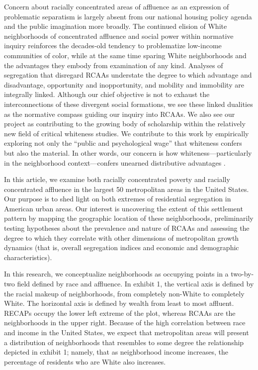 \documentclass[11pt,]{article}
\begin{document}
Concern about racially concentrated areas of affluence as an expression
of problematic separatism is largely absent from our national housing
policy agenda and the public imagination more broadly. The continued
elision of White neighborhoods of concentrated affluence and social
power within normative inquiry reinforces the decades-old tendency to
problematize low-income communities of color, while at the same time
sparing White neighborhoods and the advantages they embody from
examination of any kind. Analyses of segregation that disregard RCAAs
understate the degree to which advantage and disadvantage, opportunity
and inopportunity, and mobility and immobility are integrally linked.
Although our chief objective is not to exhaust the interconnections of
these divergent social formations, we see these linked dualities as the
normative compass guiding our inquiry into RCAAs. We also see our
project as contributing to the growing body of scholarship within the
relatively new field of critical whiteness studies. We contribute to
this work by empirically exploring not only the ``public and
psychological wage'' that whiteness confers
\autocite{du2017black,roediger1999wages} but also the material. In other
words, our concern is how whiteness---particularly in the neighborhood
context---confers unearned distributive advantages
\autocite{lipsitz2006possessive}.

In this article, we examine both racially concentrated poverty and
racially concentrated affluence in the largest 50 metropolitan areas in
the United States. Our purpose is to shed light on both extremes of
residential segregation in American urban areas. Our interest is
uncovering the extent of this settlement pattern by mapping the
geographic location of these neighborhoods, preliminarily testing
hypotheses about the prevalence and nature of RCAAs and assessing the
degree to which they correlate with other dimensions of metropolitan
growth dynamics (that is, overall segregation indices and economic and
demographic characteristics).

In this research, we conceptualize neighborhoods as occupying points in
a two-by-two field defined by race and affluence. In exhibit 1, the
vertical axis is defined by the racial makeup of neighborhoods, from
completely non-White to completely White. The horizontal axis is defined
by wealth from least to most affluent. RECAPs occupy the lower left
extreme of the plot, whereas RCAAs are the neighborhoods in the upper
right. Because of the high correlation between race and income in the
United States, we expect that metropolitan areas will present a
distribution of neighborhoods that resembles to some degree the
relationship depicted in exhibit 1; namely, that as neighborhood income
increases, the percentage of residents who are White also increases.
\end{document}
